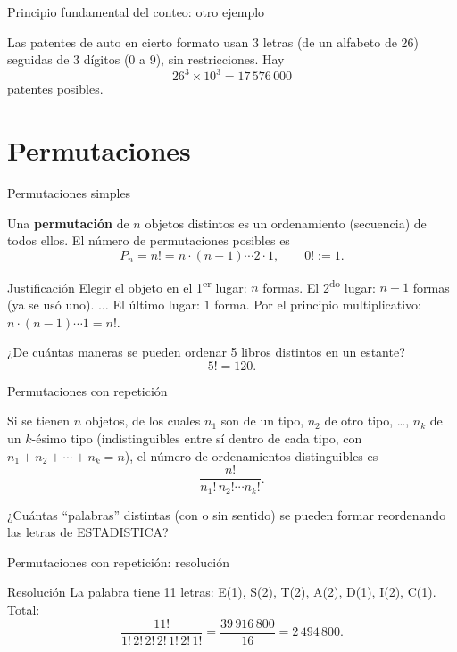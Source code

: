 \documentclass[aspectratio=169,11pt]{beamer}
\begin{document}
\begin{frame}{Principio fundamental del conteo: otro ejemplo}
\begin{example}
Las patentes de auto en cierto formato usan 3 letras (de un alfabeto de 26) seguidas de 3 dígitos (0 a 9), sin restricciones. Hay
\[
26^3 \times 10^3 = 17\,576\,000
\]
patentes posibles.
\end{example}
\end{frame}

\section{Permutaciones}

\begin{frame}{Permutaciones simples}
\begin{definition}
Una \textbf{permutación} de $n$ objetos distintos es un ordenamiento (secuencia) de todos ellos. El número de permutaciones posibles es
\[
P_n = n! = n\cdot(n-1)\cdots 2\cdot 1, \qquad 0!:=1.
\]
\end{definition}
\begin{block}{Justificación}
Elegir el objeto en el 1\textsuperscript{er} lugar: $n$ formas. El 2\textsuperscript{do} lugar: $n-1$ formas (ya se usó uno). $\dots$ El último lugar: $1$ forma. Por el principio multiplicativo: $n\cdot(n-1)\cdots 1 = n!$.
\end{block}
\begin{example}
¿De cuántas maneras se pueden ordenar 5 libros distintos en un estante?
\[
5! = 120.
\]
\end{example}
\end{frame}

\begin{frame}{Permutaciones con repetición}
\begin{definition}
Si se tienen $n$ objetos, de los cuales $n_1$ son de un tipo, $n_2$ de otro tipo, \dots, $n_k$ de un $k$-ésimo tipo (indistinguibles entre sí dentro de cada tipo, con $n_1+n_2+\cdots+n_k=n$), el número de ordenamientos distinguibles es
\[
\frac{n!}{n_1!\,n_2! \cdots n_k!}.
\]
\end{definition}
\begin{example}
¿Cuántas ``palabras'' distintas (con o sin sentido) se pueden formar reordenando las letras de \textsc{ESTADISTICA}?
\end{example}
\end{frame}

\begin{frame}{Permutaciones con repetición: resolución}
\begin{block}{Resolución}
La palabra tiene 11 letras: E(1), S(2), T(2), A(2), D(1), I(2), C(1). Total:
\[
\frac{11!}{1!\,2!\,2!\,2!\,1!\,2!\,1!} = \frac{39\,916\,800}{16} = 2\,494\,800.
\]
\end{block}
\end{frame}
\end{document}
